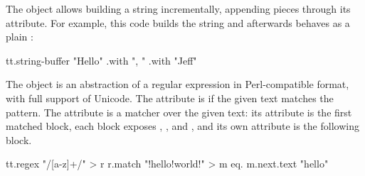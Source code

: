 The  object allows building a string incrementally,
  appending pieces through its  attribute.
For example, this code builds the string 
  and afterwards behaves as a plain :

\begin{ffcode}
tt.string-buffer "Hello"
  .with ", "
  .with "Jeff"
\end{ffcode}

The  object is an abstraction of a regular expression
  in Perl-compatible format, with full support of Unicode.
The  attribute is  if the given text
  matches the pattern.
The  attribute is a matcher over the given text: its
   attribute is the first matched block, each block exposes
  , , and , and its own 
  attribute is the following block.

\begin{ffcode}
tt.regex "/[a-z]+/" > r
r.match "!hello!world!" > m
eq.
  m.next.text
  "hello"
\end{ffcode}
